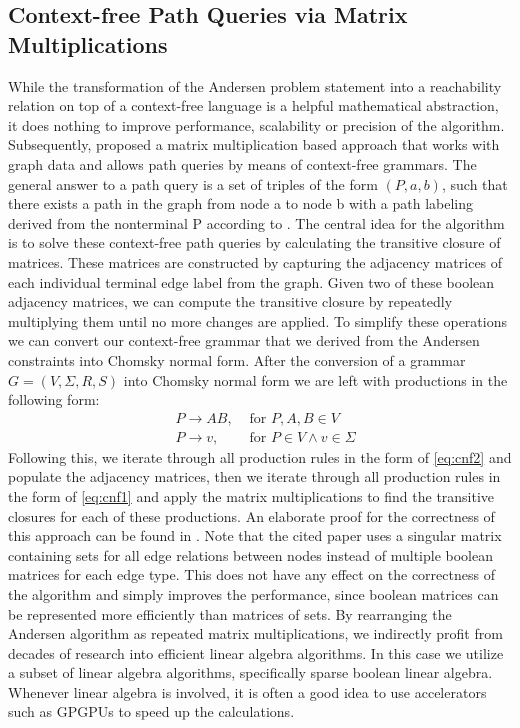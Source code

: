 \subsection{Context-free Path Queries via Matrix Multiplications}
While the transformation of the Andersen problem statement into a reachability relation on top of a context-free language is a helpful mathematical abstraction, it does nothing to improve performance, scalability or precision of the algorithm.
Subsequently, \cite{azimov2018context} proposed a matrix multiplication based approach that works with graph data and allows path queries by means of context-free grammars.
The general answer to a path query is a set of triples of the form $(P,a,b)$, such that there exists a path in the graph from node a to node b with a path labeling derived from the nonterminal P according to \cite{azimov2018context}.
The central idea for the algorithm is to solve these context-free path queries by calculating the transitive closure of matrices. These matrices are constructed by capturing the adjacency matrices of each individual terminal edge label from the graph. Given two of these boolean adjacency matrices, we can compute the transitive closure by repeatedly multiplying them until no more changes are applied.
To simplify these operations we can convert our context-free grammar that we derived from the Andersen constraints into Chomsky normal form.
After the conversion of a grammar $G=(V,\Sigma,R,S)$ into Chomsky normal form we are left with productions in the following form:
\begin{align}
     & P\rightarrow AB, & \textrm{ for } P,A,B \in V \label{eq:cnf1}               \\
     & P\rightarrow v,  & \textrm{ for } P \in V \land v\in \Sigma \label{eq:cnf2}
\end{align}
Following this, we iterate through all production rules in the form of \autoref{eq:cnf2} and populate the adjacency matrices, then we iterate through all production rules in the form of \autoref{eq:cnf1} and apply the matrix multiplications to find the transitive closures for each of these productions.
An elaborate proof for the correctness of this approach can be found in \cite{azimov2018context}.
Note that the cited paper uses a singular matrix containing sets for all edge relations between nodes instead of multiple boolean matrices for each edge type.
This does not have any effect on the correctness of the algorithm and simply improves the performance, since boolean matrices can be represented more efficiently than matrices of sets.
By rearranging the Andersen algorithm as repeated matrix multiplications, we indirectly profit from decades of research into efficient linear algebra algorithms.
In this case we utilize a subset of linear algebra algorithms, specifically sparse boolean linear algebra.
Whenever linear algebra is involved, it is often a good idea to use accelerators such as GPGPUs to speed up the calculations.

